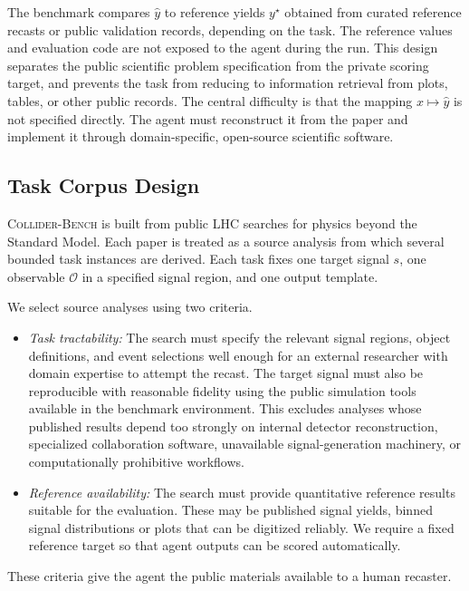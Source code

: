 \documentclass{article}
\newcommand{\ColliderBench}{\textsc{Collider-Bench}}
\begin{document}
The benchmark compares $\hat{y}$ to reference yields $y^\star$ obtained from curated reference recasts or public validation records, depending on the task. The reference values and evaluation code are not exposed to the agent during the run. This design separates the public scientific problem specification from the private scoring target, and prevents the task from reducing to information retrieval from plots, tables, or other public records. The central difficulty is that the mapping $x \mapsto \hat{y}$ is not specified directly. The agent must reconstruct it from the paper and implement it through domain-specific, open-source scientific software.

\subsection{Task Corpus Design}
\label{sec:tasks}

\ColliderBench{} is built from public LHC searches for physics beyond the Standard Model. Each paper is treated as a source analysis from which several bounded task instances are derived. Each task fixes one target signal \(s\), one observable \(\mathcal{O}\) in a specified signal region, and one output template.

We select source analyses using two criteria.
\begin{itemize}
\item {\it Task tractability:}
The search must specify the relevant signal regions, object definitions, and event selections well enough for an external researcher with domain expertise to attempt the recast. The target signal must also be reproducible with reasonable fidelity using the public simulation tools available in the benchmark environment. This excludes analyses whose published results depend too strongly on internal detector reconstruction, specialized collaboration software, unavailable signal-generation machinery, or computationally prohibitive workflows.
\item{\it Reference availability:}
The search must provide quantitative reference results suitable for the evaluation. These may be published signal yields, binned signal distributions or plots that can be digitized reliably. We require a fixed reference target so that agent outputs can be scored automatically.
\end{itemize}

These criteria give the agent the public materials available to a human recaster.
\end{document}
